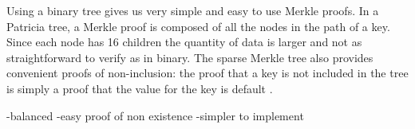 Using a binary tree gives us very simple and easy to use Merkle proofs. In a Patricia tree, a Merkle proof is composed of all the nodes in the path of a key. Since each node has 16 children the quantity of data is larger and not as straightforward to verify as in binary.
The sparse Merkle tree also provides convenient proofs of non-inclusion: the proof that a key is not included in the tree is simply a proof that the value for the key is default .

-balanced
-easy proof of non existence
-simpler to implement

